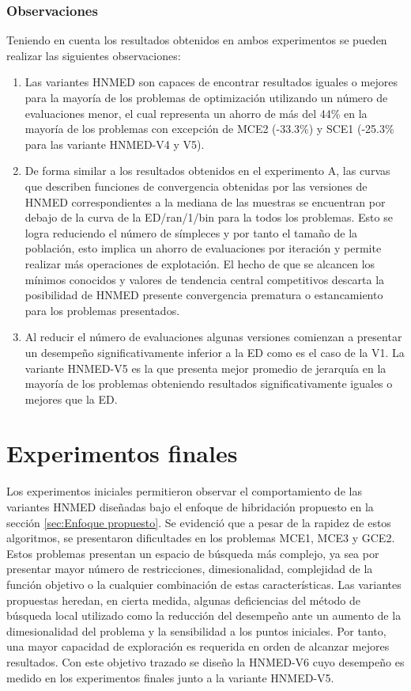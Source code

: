 \subsubsection{Observaciones}
Teniendo en cuenta los resultados obtenidos en ambos experimentos se pueden realizar las siguientes observaciones:
\begin{enumerate}
	\item Las variantes HNMED son capaces de encontrar resultados iguales o mejores para la mayoría de los problemas de optimización utilizando un número de evaluaciones menor, el cual representa un ahorro de más del 44\% en la mayoría de los problemas con excepción de MCE2 (-33.3\%) y SCE1 (-25.3\% para las variante HNMED-V4 y V5).      
	\item De forma similar a los resultados obtenidos en el experimento A, las curvas que describen funciones de convergencia obtenidas por las versiones de HNMED correspondientes a la mediana de las muestras se encuentran por debajo de la curva de la ED/ran/1/bin para la todos los problemas. Esto se logra reduciendo el número de símpleces y por tanto el tamaño de la población, esto implica un ahorro de evaluaciones por iteración y  permite realizar más operaciones de explotación. El hecho de que se alcancen los mínimos conocidos y valores de tendencia central competitivos descarta la posibilidad de HNMED presente convergencia prematura o estancamiento para los problemas presentados. 
	\item Al reducir el número de evaluaciones algunas versiones comienzan a presentar un desempeño significativamente inferior a la ED como es el caso de la V1. La variante HNMED-V5 es la que presenta mejor promedio de jerarquía en la mayoría de los problemas obteniendo resultados significativamente iguales o mejores que la ED.
\end{enumerate}




\section{Experimentos finales}
Los experimentos iniciales permitieron observar el comportamiento de las variantes HNMED diseñadas bajo el enfoque de hibridación propuesto en la sección \ref{sec:Enfoque propuesto}. Se evidenció que a pesar de la rapidez de estos algoritmos, se presentaron dificultades en los problemas MCE1, MCE3 y GCE2. Estos problemas presentan un espacio de búsqueda más complejo, ya sea por presentar mayor número de restricciones, dimesionalidad, complejidad de la función objetivo o la cualquier combinación de estas características. Las variantes propuestas heredan, en cierta medida, algunas deficiencias del método de búsqueda local utilizado como la reducción del desempeño ante un aumento de la dimesionalidad del problema y la sensibilidad a los puntos iniciales. Por tanto, una mayor capacidad de exploración es requerida en orden de alcanzar mejores resultados. Con este objetivo trazado se diseño la HNMED-V6 cuyo desempeño es medido en los experimentos finales junto a la variante HNMED-V5.


